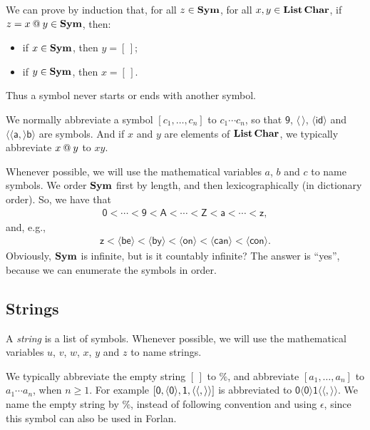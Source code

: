 We can prove by induction that, for all $z\in\mathbf{Sym}$, for all
$x,y\in\mathbf{List}\,\mathbf{Char}$, if $z = x\mathbin{@} y\in\mathbf{Sym}$, then:
\begin{itemize}
\item if $x\in\mathbf{Sym}$, then $y=[\,]$;
\item if $y\in\mathbf{Sym}$, then $x=[\,]$.
\end{itemize}
Thus a symbol never starts or ends with another symbol.

We normally abbreviate a symbol $[c_1,\ldots,c_n]$ to $c_1\cdots c_n$,
so that $\mathsf{9}$, $\langle\,\rangle$, $\langle\mathsf{id}\rangle$
and $\mathsf{\langle\langle a,\rangle b\rangle}$ are symbols.  And if
$x$ and $y$ are elements of $\mathbf{List}\,\mathbf{Char}$, we
typically abbreviate $x\mathbin{@} y$ to
$xy$.

Whenever possible, we will use the mathematical variables $a$, $b$ and
$c$ to name symbols.
%
%
We order $\mathbf{Sym}$ first by length, and then lexicographically (in
dictionary order).  So, we have that
\begin{gather*}
\mathsf{0} < \cdots < \mathsf{9} < \mathsf{A} < \cdots < \mathsf{Z}
< \mathsf{a} < \cdots < \mathsf{z} ,
\end{gather*}
and, e.g.,
\begin{gather*}
\mathsf{z} < \mathsf{\langle be\rangle} < \mathsf{\langle by\rangle} <
\mathsf{\langle on\rangle} < \mathsf{\langle can\rangle} <
\mathsf{\langle con\rangle} .
\end{gather*}
%
Obviously, $\mathbf{Sym}$ is infinite, but is it countably infinite?
%
The answer is ``yes'', because we can enumerate the symbols in order.
%

\subsection{Strings}

%
A \emph{string}
%
is a list of symbols.
Whenever possible, we will use the mathematical variables $u$,
%
%
$v$, $w$, $x$, $y$ and $z$ to name strings.

We typically abbreviate the empty string $[\,]$ to $\%$, and
%
%
%
abbreviate $[a_1,\ldots,a_n]$ to $a_1\cdots a_n$, when $n\geq 1$.
For example
$[\mathsf{0},\langle\mathsf{0}\rangle,\mathsf{1},
\langle\langle,\rangle\rangle]$ is abbreviated to $\mathsf{0\langle
  0\rangle1\langle\langle,\rangle\rangle}$.
We name the empty string by $\%$, instead of following convention and
using $\epsilon$, since this symbol can also be used in Forlan.

